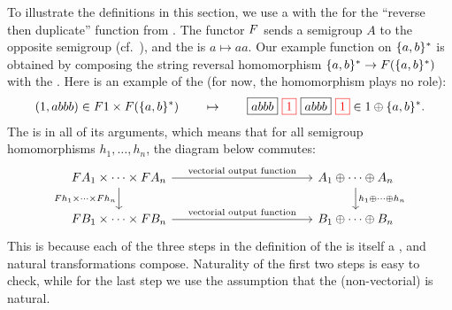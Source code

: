 \AP To illustrate the definitions in this section, we use a  with the
 for the \enquote{reverse then duplicate} function from
. The functor $\functor$ sends a semigroup $A$ to the
opposite semigroup (cf.~), and the  is $a
\mapsto aa$. Our example function on $\{a,b\}^*$ is obtained by composing the
string reversal homomorphism $\set{a,b}^* \to \functor(\set{a,b}^*)$ with the
. Here is an example of the  (for now,
the homomorphism plays no role):
\begin{align*}
    (1,abbb) \in \functor 1 \times \functor(\set{a,b}^*) \qquad \mapsto \qquad 
  \boxed{abbb} \ \red{\boxed{1}} \  \boxed{abbb}\ \red{\boxed{1}} \in 1 \oplus \set{a,b}^*.
\end{align*}
The  is  in all of its arguments, which means
that for all semigroup homomorphisms $h_1,\ldots,h_n$, the diagram below commutes:
\[
\begin{tikzcd}
    [column sep=4cm]
\functor A_1 \times \cdots \times \functor A_n
\ar[r,"\text{vectorial output function}"]
\ar[d,"\functor h_1 \times \cdots \times \functor h_n"']
&
A_1 \oplus \cdots \oplus A_n
\ar[d,"h_1 \oplus \cdots \oplus h_n"]
\\
\functor B_1 \times \cdots \times \functor B_n
\ar[r,"\text{vectorial output function}"]
&
B_1 \oplus \cdots \oplus B_n
\end{tikzcd}
\]
This is because each of the three steps in the definition of the  is itself a , and natural transformations compose.  Naturality of the first two steps is easy to check, while for the last step we use the assumption that the (non-vectorial)  is natural.



